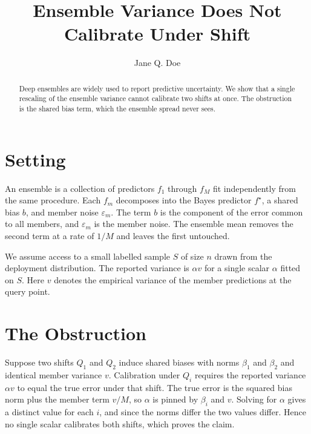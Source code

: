 \documentclass[10pt,twocolumn]{article}
\title{Ensemble Variance Does Not Calibrate Under Shift}
\author{Jane Q. Doe}
\date{}
\newcommand{\s}[1]{#1}
\newcommand{\m}[2]{#1}
\begin{document}
\maketitle

\begin{abstract}
\s{Deep ensembles are widely used to report predictive uncertainty.}
\s{We show that a single rescaling of the ensemble variance cannot calibrate two shifts at once.}
\s{The obstruction is the shared bias term, which the ensemble spread never sees.}
\end{abstract}

\section{Setting}

\s{An ensemble is a collection of predictors \m{$f_1$}{f1} through \m{$f_M$}{fM} fit independently from the same procedure.}
\s{Each \m{$f_m$}{fm} decomposes into the Bayes predictor \m{$f^\star$}{f ⋆}, a shared bias \m{$b$}{b}, and member noise \m{$\varepsilon_m$}{εm}.}
\s{The term \m{$b$}{b} is the component of the error common to all members, and \m{$\varepsilon_m$}{εm} is the member noise.}
\s{The ensemble mean removes the second term at a rate of \m{$1/M$}{1/M} and leaves the first untouched.}

\s{We assume access to a small labelled sample \m{$S$}{S} of size \m{$n$}{n} drawn from the deployment distribution.}
\s{The reported variance is \m{$\alpha v$}{αv} for a single scalar \m{$\alpha$}{α} fitted on \m{$S$}{S}.}
\s{Here \m{$v$}{v} denotes the empirical variance of the member predictions at the query point.}

\section{The Obstruction}

\s{Suppose two shifts \m{$Q_1$}{Q1} and \m{$Q_2$}{Q2} induce shared biases with norms \m{$\beta_1$}{β1} and \m{$\beta_2$}{β2} and identical member variance \m{$v$}{v}.}
\s{Calibration under \m{$Q_i$}{Qi} requires the reported variance \m{$\alpha v$}{αv} to equal the true error under that shift.}
\s{The true error is the squared bias norm plus the member term \m{$v/M$}{v/M }, so \m{$\alpha$}{α} is pinned by \m{$\beta_i$}{βi} and \m{$v$}{v}.}
\s{Solving for \m{$\alpha$}{α} gives a distinct value for each \m{$i$}{i}, and since the norms differ the two values differ.}
\s{Hence no single scalar calibrates both shifts, which proves the claim.}
\end{document}
